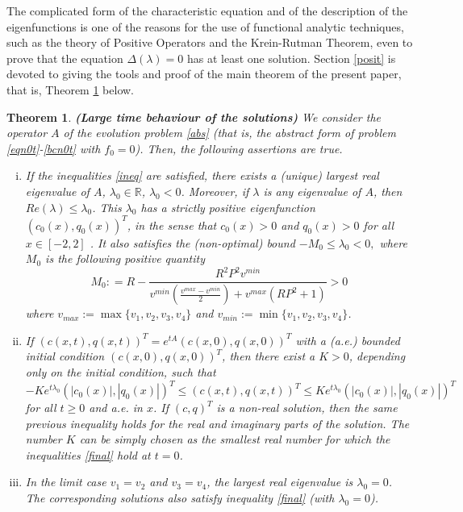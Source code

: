 \documentclass[a4paper]{article}
\newtheorem{thm}{Theorem}[section]
\numberwithin{equation}{section}
\begin{document}
The complicated form of the characteristic equation and of the description of the eigenfunctions is one of the reasons for the use of functional analytic techniques, such as the theory of Positive Operators and the Krein-Rutman Theorem, even to prove that the equation $\Delta(\lambda)=0$ has at least one solution. Section \ref{posit} is devoted to giving the tools and proof of the main theorem of the present paper, that is, Theorem \ref{thfa} below.
\begin{thm}\label{thfa}\textbf{(Large time behaviour of the solutions)}
We consider the operator $A$ of the evolution problem \eqref{abs} (that is, the abstract form of problem \eqref{eqn0t}-\eqref{bcn0t} with $f_0=0$). Then, the following assertions are true.
\begin{enumerate}[(i)]
\item If the inequalities \eqref{ineq} are satisfied, there exists a (unique) largest real eigenvalue of $A$, $\lambda_0\in\mathbb{R}$, $\lambda_0<0$.
Moreover, if $\lambda$ is any eigenvalue of $A$, then $Re(\lambda)\leq \lambda_0$. This $\lambda_0$ has a strictly positive eigenfunction $(c_0(x),q_0(x))^T$, in the sense that $c_0(x)>0$ and $q_0(x)>0$ for all $x\in[-2,2]$ . It also satisfies the (non-optimal) bound $-M_0\le\lambda_0<0,$ where $M_0$ is the following positive quantity
\begin{equation}\label{eps0}
M_0: = R-\dfrac{ R^2P^2v^{min}}{v^{min} \left( \frac{v^{max}-v^{min}}{2}\right)+v^{max}\left(RP^2+1\right)} >0
\end{equation}
where $v_{max}:=\max\{v_1,v_2,v_3, v_4\}$ and $v_{min}:=\min\{v_1,v_2,v_3,v_4\}$.
\item If $(c(x,t),q(x,t))^T=e^{tA}(c(x,0),q(x,0))^T$ with a (a.e.) bounded initial condition $(c(x,0),q(x,0))^T$, then there exist a $K>0$, depending only on the initial condition, such that
\begin{equation}\label{final}
 -K e^{t\lambda_0}\left(|c_0(x)|,|q_0(x)|\right)^T \leq \left(c(x,t),q(x,t)\right)^T\le K e^{t\lambda_0}\left(|c_0(x)|,|q_0(x)|\right)^T
\end{equation}
for all $t\ge 0$ and a.e. in $x$. If $(c,q)^T$ is a non-real solution, then the same previous inequality holds for the real and imaginary parts of the solution. The number $K$ can be simply chosen as the smallest real number for which the inequalities \eqref{final} hold at $t=0$.

\item In the limit case $v_1=v_2$ and $v_3=v_4$, the largest real eigenvalue is $\lambda_0=0$. The corresponding solutions also satisfy inequality \eqref{final} (with $\lambda_0=0$).
\end{enumerate}
 \end{thm}
\end{document}
